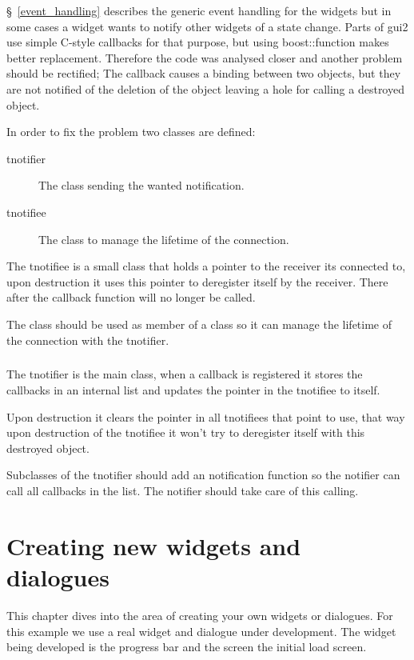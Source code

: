 \documentclass[a4paper,notitlepage]{report}
\begin{document}
\S~\ref{event_handling} describes the generic event handling for the widgets but
in some cases a widget wants to notify other widgets of a state change. Parts of
gui2 use simple C-style callbacks for that purpose, but using boost::function
makes better replacement. Therefore the code was analysed closer and another
problem should be rectified; The callback causes a binding between two objects,
but they are not notified of the deletion of the object leaving a hole for
calling a destroyed object.

In order to fix the problem two classes are defined:

\begin{description}
\item[tnotifier] The class sending the wanted notification.
\item[tnotifiee] The class to manage the lifetime of the connection.
\end{description}

The tnotifiee is a small class that holds a pointer to the receiver its
connected to, upon destruction it uses this pointer to deregister itself by the
receiver. There after the callback function will no longer be called.

The class should be used as member of a class so it can manage the lifetime of
the connection with the tnotifier.

\paragraph{}

The tnotifier is the main class, when a callback is registered it stores the
callbacks in an internal list and updates the pointer in the tnotifiee to
itself.

Upon destruction it clears the pointer in all tnotifiees that point to use, that
way upon destruction of the tnotifiee it won't try to deregister itself with
this destroyed object.

Subclasses of the tnotifier should add an notification function so the notifier
can call all callbacks in the list. The notifier should take care of this
calling.


\chapter{Creating new widgets and dialogues}

This chapter dives into the area of creating your own widgets or dialogues. For
this example we use a real widget and dialogue under development. The widget
being developed is the progress bar and the screen the initial load screen.
\end{document}

